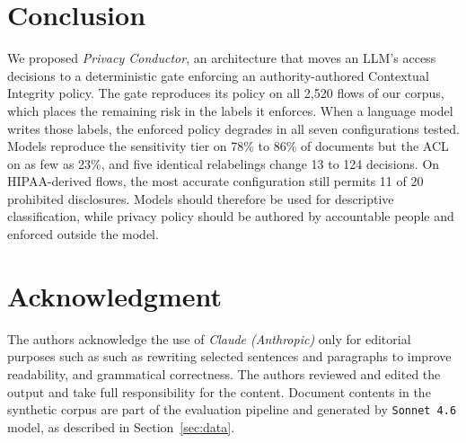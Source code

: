 {\section{Conclusion}
\label{sec:conclusion}
We proposed {\em Privacy Conductor}, an architecture that moves an LLM's access
decisions to a deterministic gate enforcing an authority-authored Contextual
Integrity policy. The gate reproduces its policy on all 2,520 flows of our
corpus, which places the remaining risk in the labels it enforces. When a
language model writes those labels, the enforced policy degrades in all seven
configurations tested. Models reproduce the sensitivity tier on 78\% to 86\% of
documents but the ACL on as few as 23\%, and five identical relabelings change
13 to 124 decisions. On HIPAA-derived flows, the most accurate configuration
still permits 11 of 20 prohibited disclosures. Models should therefore be used
for descriptive classification, while privacy policy should be authored by
accountable people and enforced outside the model.
}


\section*{Acknowledgment}

The authors acknowledge the use of \emph{Claude (Anthropic)} only for editorial purposes such as such as rewriting selected sentences and paragraphs to improve readability, and grammatical correctness. The authors reviewed and edited the output and take full responsibility for the content. Document contents in the synthetic corpus are part of the evaluation pipeline and generated by {\tt Sonnet 4.6} model, as described in Section~\ref{sec:data}.

